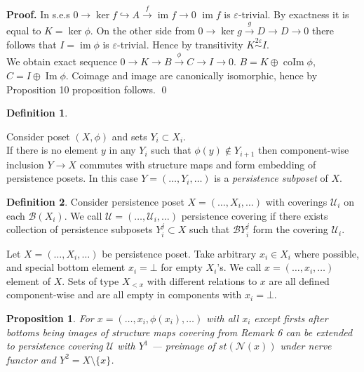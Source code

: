 \documentclass[a4paper, 12pt]{article}
\newtheorem{proposition}{Proposition}
\theoremstyle{definition}
\newtheorem{definition}{Definition}
\theoremstyle{remark}
\newenvironment{pf}{\noindent\textbf{Proof.}}{\qed}
\newcommand{\define}[1]{{\textit{#1}}}
\begin{document}
\begin{pf}
  In s.e.s $0 \to \ker{f} \hookrightarrow A \xrightarrow{f} \operatorname{im}f \to 0$ $\operatorname{im}f$ is $\varepsilon$-trivial. By exactness it is equal to $K = \ker \phi$. On the other side from $0 \to \ker{g} \xrightarrow{g} D \to D \to 0$ there follows that $I = \operatorname{im} \phi$ is $\varepsilon$-trivial. Hence by transitivity $K \stackrel{2\varepsilon}{\sim} I$.\\

  We obtain exact sequence $0 \to K \to B \xrightarrow{\phi} C \to I \to 0$. $B = K \oplus \operatorname{coIm}\phi$, $C = I \oplus \operatorname{Im} \phi$. Coimage and image are canonically isomorphic, hence by Proposition 10 proposition follows.
\end{pf}\\

\begin{definition} ~ \par
  Consider poset $(X,\phi)$ and sets $Y_i \subset X_i$.\\

  If there is no element $y$ in any $Y_i$ such that $\phi(y) \not\in Y_{i+1}$ then component-wise inclusion $Y \to X$ commutes with structure maps and form embedding of persistence posets. In this case $Y=(\ldots,Y_i,\ldots)$ is a \define {persistence subposet} of $X$.
\end{definition}

\begin{definition}
  Consider persistence poset $X = (\ldots,X_i,\ldots)$ with coverings $\mathcal{U}_i$ on each $\mathcal{B}(X_i)$. We call $\mathcal{U} = (\ldots,\mathcal{U}_i,\ldots)$ persistence covering if there exists collection of persistence subposets $Y^j_i \subset X$ such that $\mathcal{B}Y^j_i$ form the covering $\mathcal{U}_i$.\\
\end{definition}

Let $X=(\ldots,X_i,\ldots)$ be persistence poset. Take arbitrary $x_i \in X_i$ where possible, and special bottom element $x_i = \bot$ for empty $X_i$'s. We call $x = (\ldots, x_i, \ldots)$ element of $X$. Sets of type $X_{<x}$ with different relations to $x$ are all defined component-wise and are all empty in components with $x_i = \bot$.\\

\begin{proposition}
  For $x = (\ldots,x_i,\phi(x_i),\ldots)$ with all $x_i$ except firsts after bottoms being images of structure maps covering from Remark 6 can be extended to persistence covering $\mathcal{U}$ with $Y^1$ --- preimage of $st(\mathcal{N}(x))$ under nerve functor and $Y^2 = X \setminus \{x\}$.
\end{proposition}
\end{document}
